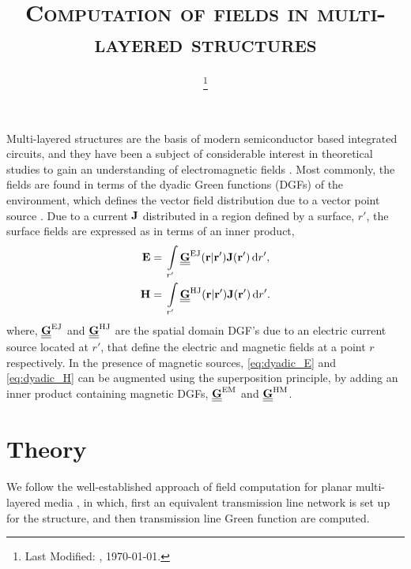 \documentclass[12pt]{article}
\begin{document}
\title{\textsc{Computation of fields in multi-layered structures}}

\date{\footnote{Last Modified: \currenttime, \today.}}

\maketitle

Multi-layered structures are the basis of modern semiconductor based integrated circuits, and they have been a subject of considerable interest in theoretical studies to gain an understanding of electromagnetic fields \cite{somethinginhere}. Most commonly, the fields are found in terms of the dyadic Green functions (DGFs) of the environment, which defines the vector field distribution due to a vector point source \cite{van2007electromagnetic}. Due to a current $\mathbf{J}$ distributed in a region defined by a surface, $r'$, the surface fields are expressed as in terms of an inner product,
%
\begin{subequations}
  \begin{align}
    \mathbf{E} ={}& \int\limits_{r'} \underline{\underline{\mathbf{G}}}^\mathrm{EJ}(\mathbf{r} | \mathbf{r'}) \mathbf{J}(\mathbf{r'}) \mathop{}\!\mathrm{d}{r'},
    \label{eq:dyadic_E}\\
    \mathbf{H} ={}& \int\limits_{r'} \underline{\underline{\mathbf{G}}}^\mathrm{HJ}(\mathbf{r} | \mathbf{r'}) \mathbf{J}(\mathbf{r'}) \mathop{}\!\mathrm{d}{r'}.
    \label{eq:dyadic_H}
  \end{align}
  \label{eq:dyadic}%
\end{subequations}
where, $\underline{\underline{\mathbf{G}}}^\mathrm{EJ}$ and $\underline{\underline{\mathbf{G}}}^\mathrm{HJ}$ are the spatial domain DGF's due to an electric current source located at $r'$, that define the electric and magnetic fields at a point $r$ respectively. In the presence of magnetic sources, \eqref{eq:dyadic_E} and \eqref{eq:dyadic_H} can be augmented using the superposition principle, by adding an inner product containing magnetic DGFs, $\underline{\underline{\mathbf{G}}}^\mathrm{EM}$ and
$\underline{\underline{\mathbf{G}}}^\mathrm{HM}$.
\section{Theory}
%
We follow the well-established approach of field computation for planar multi-layered media \cite{Michalski2005,Michalski1997}, in which, first an equivalent transmission line network is set up for the structure, and then transmission line Green function are computed.
\end{document}
